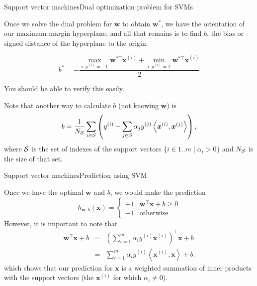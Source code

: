 \documentclass{beamer}
\renewcommand{\vec}[1]{\boldsymbol{#1}}
\begin{document}
\begin{frame}{Support vector machines}{Dual optimization problem for SVMs}

  Once we solve the dual problem for $\vec{w}$ to obtain $\vec{w}^*$,
  we have the \alert{orientation} of our maximum margin hyperplane,
  and all that remains is to find $b$, the bias or signed distance of
  the hyperplane to the origin.

  \medskip

  \[ b^* = -\frac{\max_{i:y^{(i)}=-1}\vec{w}^{*\top}\vec{x}^{(i)} + \min_{i:y^{(i)}=1}\vec{w}^{*\top}\vec{x}^{(i)}}{2} \]

  \medskip

  You should be able to verify this easily.

  \medskip

  Note that another way to calculate $b$ (not knowing $\vec{w}$) is
  \[ b = \frac{1}{N_{\cal S}}\sum_{i\in {\cal S}} \left(
         y^{(i)} - \sum_{j\in {\cal S}} \alpha_j y^{(j)} \left< \vec{x}^{(i)},
         \vec{x}^{(j)} \right> \right), \]
  where ${\cal S}$ is the set of indexes of the support vectors $\{i \in 1..m \mid
  \alpha_i > 0\}$ and $N_{\cal S}$ is the size of that set.

\end{frame}


\begin{frame}{Support vector machines}{Prediction using SVM}

  Once we have the optimal $\vec{w}$ and $b$, we would make the
  \alert{prediction}
  \[ h_{\vec{w},b}(\vec{x}) = \begin{cases} +1 & \vec{w}^\top \vec{x}+b \ge 0 \\
    -1 & \text{otherwise} \end{cases} \]
  However, it is important to note that
  \begin{eqnarray}
    \vec{w}^\top \vec{x}+b & = & \left( \sum_{i=1}^m\alpha_i y^{(i)}\vec{x}^{(i)} \right)^\top \vec{x} + b \nonumber \\
    & = & \sum_{i=1}^m\alpha_i y^{(i)}\left< \vec{x}^{(i)}, \vec{x}\right> + b .\nonumber
  \end{eqnarray}
  which shows that our prediction for $\vec{x}$ is a \alert{weighted
    summation of inner products} with the \alert{support vectors} (the
  $\vec{x}^{(i)}$ for which $\alpha_i \ne 0$).
  
\end{frame}
\end{document}
